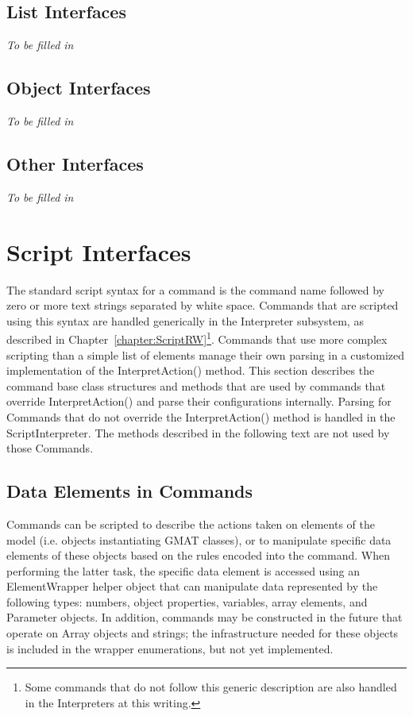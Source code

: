 \subsection{List Interfaces}

\textit{To be filled in}

\subsection{Object Interfaces}

\textit{To be filled in}

\subsection{Other Interfaces}

\textit{To be filled in}

\section{Script Interfaces}

The standard script syntax for a command is the command name followed by zero or more text strings
separated by white space.  Commands that are scripted using this syntax are handled generically in
the Interpreter subsystem, as described in Chapter~\ref{chapter:ScriptRW}\footnote{Some commands
that do not follow this generic description are also handled in the Interpreters at this writing.}.
Commands that use more complex scripting than a simple list of elements manage their own parsing in
a customized implementation of the InterpretAction() method.  This section describes the command
base class structures and methods that are used by commands that override InterpretAction() and
parse their configurations internally.  Parsing for Commands that do not override the
InterpretAction() method is handled in the ScriptInterpreter.  The methods described in the
following text are not used by those Commands.

\subsection{\label{section:ParametersInCommands}Data Elements in Commands}

Commands can be scripted to describe the actions taken on elements of the model (i.e. objects
instantiating GMAT classes), or to manipulate specific data elements of these objects based on the
rules encoded into the command.  When performing the latter task, the specific data element is
accessed using an ElementWrapper helper object that can manipulate data represented by the
following types: numbers, object properties, variables, array elements, and Parameter objects.  In
addition, commands may be constructed in the future that operate on Array objects and strings; the
infrastructure needed for these objects is included in the wrapper enumerations, but not yet
implemented.

